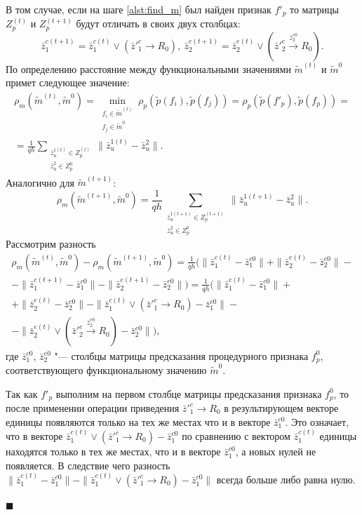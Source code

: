 \documentclass[a4paper, 12pt]{article}
\theoremstyle{break}
\newenvironment{Proof}%
	{\par\noindent{\bf Доказательство.}}%
	{\hfill$\scriptstyle\blacksquare$}
\numberwithin{equation}{section}
\begin{document}
\begin{Proof}
		В том случае, если на шаге \ref{alst:find_m} был найден признак $f'_p$ то матрицы $Z_p^{(t)}$ и $Z_p^{(t+1)}$ будут отличать в своих двух столбцах:
		\begin{equation*}
		\bar z_1^{c(t+1)}=\bar z_1^{c(t)}\vee (\bar z'^c_1\rightarrow R_0),\ \bar z_2^{e(t+1)}=\bar z_2^{e(t)}\vee (\bar z'^e_2\xrightarrow{\bar z_2^{e0}} R_0).
		\end{equation*}
		По определению расстояние между функциональными значениями $\tilde m^{(t)}$ и $\tilde m^0$ примет следующее значение:
		\begin{eqnarray*}
			\rho_m(\tilde m^{(t)},\tilde m^0)=\min\limits_{\substack{f_i\in\tilde m^{(t)}\\f_j\in\tilde m^0}}\rho_p(\tilde p(f_i),\tilde p(f_j ))=\rho_p(\tilde p(f'_p),\tilde p(f_p))=\\
			=\frac{1}{qh}\sum\limits_{\substack{\bar z_u^{1(t)}\in Z_p^{(t)}\\\bar z_u^2\in Z_p^0}}\|\bar z_u^{1(t)}-\bar z_u^2\|.
		\end{eqnarray*}
		Аналогично для $\tilde m^{(t+1)}$:
		\begin{equation*}
		\rho_m(\tilde m^{(t+1)},\tilde m^0)=\frac{1}{qh}\sum_{\substack{\bar z_u^{1(t+1)}\in Z_p^{(t+1)}\\\bar z_u^2\in Z_p^0}}\|\bar z_u^{1(t+1)}-\bar z_u^2\|.
		\end{equation*}
		Рассмотрим разность 
		\begin{eqnarray*}
			\rho_m(\tilde m^{(t)},\tilde m^0)-\rho_m(\tilde m^{(t+1)},\tilde m^0)=\frac{1}{qh}(\|\bar z_1^{c(t)}-\bar z_1^{c0}\|+\|\bar z_2^{e(t)}-\bar z_2^{e0}\|-\nonumber \\
			-\|\bar z_1^{c(t+1)}-\bar z_1^{c0}\|-\|\bar z_2^{e(t+1)}-\bar z_2^{e0}\|)=\frac{1}{qh}(\|\bar z_1^{c(t)}-\bar z_1^{c0}\|+\nonumber \\
			+\|\bar z_2^{e(t)}-\bar z_2^{e0}\|-\|\bar z_1^{c(t)}\vee (\bar z'^c_1\rightarrow R_0)-\bar z_1^{c0}\|-\nonumber \\
			-\|\bar z_2^{e(t)}\vee (\bar z'^e_2\xrightarrow{\bar z_2^{e0}} R_0)-\bar z_2^{e0}\|),
		\end{eqnarray*}
		где $\bar z_1^{c0}$, $\bar z_2^{e0}$ "--- столбцы матрицы предсказания процедурного признака $f_p^0$, соответствующего функциональному значению $\tilde m^0$.
		
		Так как $f'_p$ выполним на первом столбце матрицы предсказания признака $f_p^0$, то после применении операции приведения $\bar z'^c_1\rightarrow R_0$ в результирующем векторе единицы появляются только на тех же местах что и в векторе $\bar z_1^{c0}$. Это означает, что в векторе $\bar z_1^{c(t)}\vee (\bar z'^c_1\rightarrow R_0)-\bar z_1^{c0}$ по сравнению с вектором $\bar z_1^{c(t)}$  единицы находятся только в тех же местах, что и в векторе $\bar z_1^{c0}$, а новых нулей не появляется. В следствие чего разность $\|\bar z_1^{c(t)}-\bar z_1^{c0}\|-\|\bar z_1^{c(t)}\vee (\bar z'^c_1\rightarrow R_0)-\bar z_1^{c0}\|$ всегда больше либо равна нулю.
		

\end{Proof}
\end{document}
